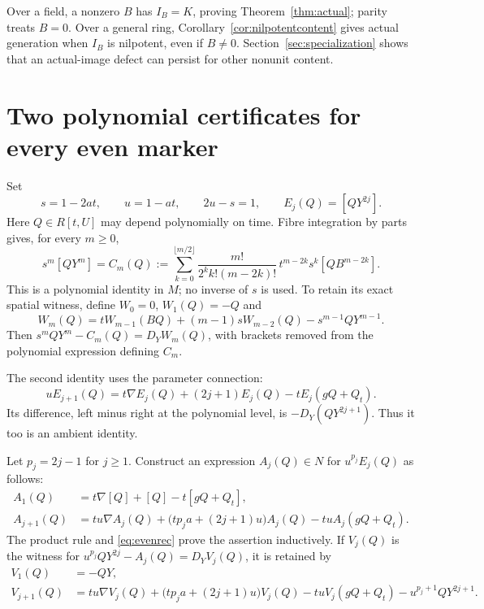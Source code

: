\documentclass[11pt]{article}
\theoremstyle{definition}\newtheorem{definition}[theorem]{Definition}
\theoremstyle{remark}\newtheorem{remark}[theorem]{Remark}
\begin{document}
Over a field, a nonzero $B$ has $I_B=K$, proving
Theorem~\ref{thm:actual}; parity treats $B=0$. Over a general ring,
Corollary~\ref{cor:nilpotentcontent} gives actual generation when
$I_B$ is nilpotent, even if $B\ne0$. Section~\ref{sec:specialization}
shows that an actual-image defect can persist for other nonunit content.

\section{Two polynomial certificates for every even marker}

Set
\[
 s=1-2at,\qquad u=1-at,\qquad 2u-s=1,
 \qquad E_j(Q)=[QY^{2j}].
\]
Here $Q\in R[t,U]$ may depend polynomially on time.
Fibre integration by parts gives, for every $m\ge0$,
\begin{equation}\label{eq:conditional}
 s^m[QY^m]=C_m(Q):=
 \sum_{k=0}^{\lfloor m/2\rfloor}
 \frac{m!}{2^k k!(m-2k)!}\,
       t^{m-2k}s^k[QB^{m-2k}].
\end{equation}
This is a polynomial identity in $M$; no inverse of $s$ is used.
To retain its exact spatial witness, define $W_0=0$, $W_1(Q)=-Q$
and
\[
 W_m(Q)=tW_{m-1}(BQ)+(m-1)sW_{m-2}(Q)-s^{m-1}QY^{m-1}.
\]
Then $s^mQY^m-C_m(Q)=D_YW_m(Q)$, with brackets removed
from the polynomial expression defining $C_m$.

The second identity uses the parameter connection:
\begin{equation}\label{eq:evenrec}
 uE_{j+1}(Q)=t\nabla E_j(Q)+(2j+1)E_j(Q)
                        -tE_j(gQ+Q_t).
\end{equation}
Its difference, left minus right at the polynomial level, is
$-D_Y(QY^{2j+1})$. Thus it too is an ambient identity.

Let $p_j=2j-1$ for $j\ge1$. Construct an expression $A_j(Q)\in N$
for $u^{p_j}E_j(Q)$ as follows:
\begin{align*}
 A_1(Q)&=t\nabla[Q]+[Q]-t[gQ+Q_t],\\
 A_{j+1}(Q)&=tu\nabla A_j(Q)
       +\bigl(tp_ja+(2j+1)u\bigr)A_j(Q)
       -tu A_j(gQ+Q_t).
\end{align*}
The product rule and \eqref{eq:evenrec} prove the assertion
inductively. If $V_j(Q)$ is the witness for
$u^{p_j}QY^{2j}-A_j(Q)=D_YV_j(Q)$, it is retained by
\begin{align*}
 V_1(Q)&=-QY,\\
 V_{j+1}(Q)&=tu\nabla V_j(Q)
       +\bigl(tp_ja+(2j+1)u\bigr)V_j(Q)
       -tu V_j(gQ+Q_t)-u^{p_j+1}QY^{2j+1}.
\end{align*}
\end{document}
